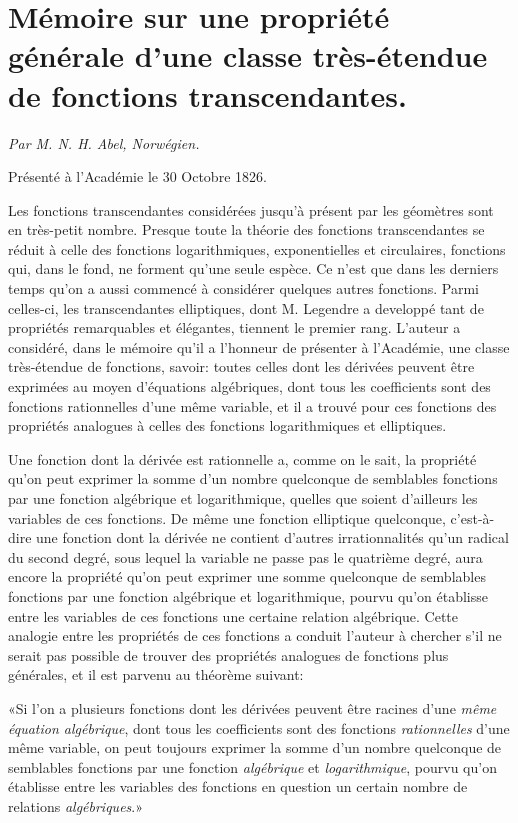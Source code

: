 \documentclass{article}
\begin{document}
\section*{Mémoire sur une propriété générale d'une classe très-étendue de fonctions transcendantes.}

\emph{Par M. N. H. Abel, Norwégien.}

Présenté à l'Académie le 30 Octobre 1826.

Les fonctions transcendantes considérées jusqu'à présent par les géomètres sont en très-petit nombre. Presque toute la théorie des fonctions transcendantes se réduit à celle des fonctions logarithmiques, exponentielles et circulaires, fonctions qui, dans le fond, ne forment qu'une seule espèce. Ce n'est que dans les derniers temps qu'on a aussi commencé à considérer quelques autres fonctions. Parmi celles-ci, les transcendantes elliptiques, dont M. Legendre a developpé tant de propriétés remarquables et élégantes, tiennent le premier rang. L'auteur a considéré, dans le mémoire qu'il a l'honneur de présenter à l'Académie, une classe très-étendue de fonctions, savoir: toutes celles dont les dérivées peuvent être exprimées au moyen d'équations algébriques, dont tous les coefficients sont des fonctions rationnelles d'une même
variable, et il a trouvé pour ces fonctions des propriétés analogues à celles des fonctions logarithmiques et elliptiques.

Une fonction dont la dérivée est rationnelle a, comme on le sait, la propriété qu'on peut exprimer la somme d'un nombre quelconque de semblables fonctions par une fonction algébrique et logarithmique, quelles que soient d'ailleurs les variables de ces fonctions. De même une fonction elliptique quelconque, c'est-à-dire une fonction dont la dérivée ne contient d'autres irrationnalités qu'un radical du second degré, sous lequel la variable ne passe pas le quatrième degré, aura encore la propriété qu'on peut exprimer une somme quelconque de semblables fonctions par une fonction algébrique et logarithmique, pourvu qu'on établisse entre les variables de ces fonctions une certaine relation algébrique. Cette analogie entre les propriétés de ces fonctions a conduit l'auteur à chercher s'il ne serait pas possible de trouver des propriétés analogues de fonctions plus générales, et il est parvenu au théorème suivant:

«Si l'on a plusieurs fonctions dont les dérivées peuvent être racines d'une \emph{même équation algébrique}, dont tous les coefficients sont des fonctions \emph{rationnelles} d'une même variable, on peut toujours exprimer la somme d'un nombre quelconque de semblables fonctions par une fonction \emph{algébrique} et \emph{logarithmique}, pourvu qu'on établisse entre les variables des fonctions en question un certain nombre de relations \emph{algébriques}.»
\end{document}
